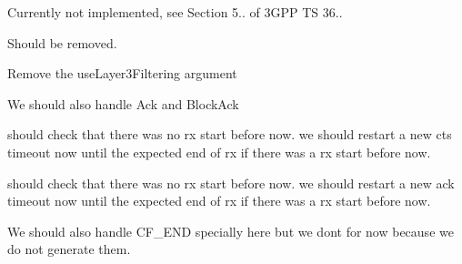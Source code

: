 \begin{DoxyRefList}
\item[\label{todo__todo000103}%
\hypertarget{todo__todo000103}{}%
Member \hyperlink{classns3_1_1LteUeRrc_abcf0c887261105ca1e7d6417af97d0ee}{ns3\+:\+:Lte\+Ue\+Rrc\+:\+:Do\+Recv\+Rrc\+Connection\+Release} (\hyperlink{structns3_1_1LteRrcSap_1_1RrcConnectionRelease}{Lte\+Rrc\+Sap\+::\+Rrc\+Connection\+Release} msg)]Currently not implemented, see Section 5.. of 3\+G\+PP TS 36..  
\item[\label{todo__todo000105}%
\hypertarget{todo__todo000105}{}%
Member \hyperlink{structns3_1_1LteUeRrc_1_1MeasValues_acf9ca07effa6ebcfa8a16fd0df1e35d7}{ns3\+:\+:Lte\+Ue\+Rrc\+:\+:Meas\+Values\+:\+:timestamp} ]Should be removed.  
\item[\label{todo__todo000104}%
\hypertarget{todo__todo000104}{}%
Member \hyperlink{classns3_1_1LteUeRrc_a8c90e4b14939e7bd7abfe09c715cf1ef}{ns3\+:\+:Lte\+Ue\+Rrc\+:\+:Save\+Ue\+Measurements} (uint16\+\_\+t cell\+Id, double rsrp, double rsrq, bool use\+Layer3\+Filtering)]Remove the use\+Layer3\+Filtering argument 
\item[\label{todo__todo000174}%
\hypertarget{todo__todo000174}{}%
Member \hyperlink{classns3_1_1MacLow_a10d347ccf6a1e3868ee1470767ed38a6}{ns3\+:\+:Mac\+Low\+:\+:Aggregate\+To\+Ampdu} (Ptr$<$ const Packet $>$ packet, const \hyperlink{classns3_1_1WifiMacHeader}{Wifi\+Mac\+Header} hdr)]We should also handle Ack and Block\+Ack  
\item[\label{todo__todo000172}%
\hypertarget{todo__todo000172}{}%
Member \hyperlink{classns3_1_1MacLow_a35adb9b4c7f1035da2cb080289ba9cf7}{ns3\+:\+:Mac\+Low\+:\+:Cts\+Timeout} (void)]should check that there was no rx start before now. we should restart a new cts timeout now until the expected end of rx if there was a rx start before now.  
\item[\label{todo__todo000173}%
\hypertarget{todo__todo000173}{}%
Member \hyperlink{classns3_1_1MacLow_a4d730ac2acea66982b4d257e06e22387}{ns3\+:\+:Mac\+Low\+:\+:Normal\+Ack\+Timeout} (void)]should check that there was no rx start before now. we should restart a new ack timeout now until the expected end of rx if there was a rx start before now.  
\item[\label{todo__todo000171}%
\hypertarget{todo__todo000171}{}%
Member \hyperlink{classns3_1_1MacLow_a6ff5bbb311cf902d961bf6871f2929d0}{ns3\+:\+:Mac\+Low\+:\+:Notify\+Nav} (Ptr$<$ const Packet $>$ packet, const \hyperlink{classns3_1_1WifiMacHeader}{Wifi\+Mac\+Header} \&hdr, Wifi\+Preamble preamble)]We should also handle C\+F\+\_\+\+E\+ND specially here but we don\textquotesingle{}t for now because we do not generate them.  

\end{DoxyRefList}

